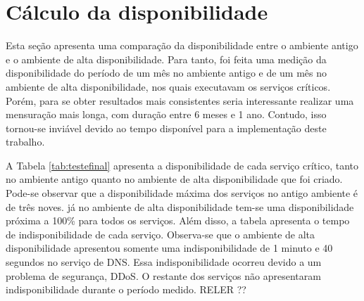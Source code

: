 \newpage
\section{Cálculo da disponibilidade}
\label{section:comparacaofinal}

Esta seção apresenta uma comparação da disponibilidade entre o ambiente antigo e o ambiente de alta disponibilidade. 
Para tanto, foi feita uma medição da disponibilidade do período de um mês no ambiente antigo e de um mês no ambiente de alta disponibilidade, 
nos quais executavam os serviços críticos. Porém, para se obter resultados mais consistentes seria interessante realizar uma mensuração mais longa, 
com duração entre 6 meses e 1 ano. Contudo, isso tornou-se inviável devido ao tempo disponível para a implementação deste trabalho. 

A Tabela \ref{tab:testefinal} apresenta a disponibilidade de cada serviço crítico, tanto no ambiente antigo quanto 
no ambiente de alta disponibilidade que foi criado. Pode-se observar que a disponibilidade máxima dos serviços no antigo ambiente é de 
três noves. já no ambiente de alta disponibilidade tem-se uma disponibilidade próxima a 100\% para todos os serviços.
Além disso, a tabela apresenta o tempo de indisponibilidade de cada serviço. Observa-se que o ambiente de alta disponibilidade apresentou
somente uma indisponibilidade de 1 minuto e 40 segundos no serviço de \ac{DNS}. Essa indisponibilidade ocorreu devido a um problema de segurança,
DDoS.
O restante dos serviços não apresentaram indisponibilidade durante o período medido.
RELER ??

